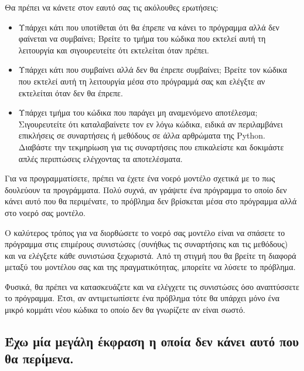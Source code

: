 \documentclass[10pt]{book}
\begin{document}
Θα πρέπει να κάνετε στον εαυτό σας τις ακόλουθες ερωτήσεις: 

\begin{itemize}

\item Υπάρχει κάτι που υποτίθεται ότι θα έπρεπε να κάνει το πρόγραμμα αλλά δεν φαίνεται να συμβαίνει;
Βρείτε το τμήμα του κώδικα που εκτελεί αυτή τη λειτουργία και σιγουρευτείτε ότι εκτελείται όταν πρέπει.

\item Υπάρχει κάτι που συμβαίνει αλλά δεν θα έπρεπε συμβαίνει;  Βρείτε τον κώδικα που εκτελεί αυτή τη
λειτουργία μέσα στο πρόγραμμά σας και ελέγξτε αν εκτελείται όταν δεν θα έπρεπε.

\item Υπάρχει τμήμα του κώδικα που παράγει μη αναμενόμενο αποτέλεσμα;  Σιγουρευτείτε ότι καταλαβαίνετε
τον εν λόγω κώδικα, ειδικά αν περιλαμβάνει επικλήσεις σε συναρτήσεις ή μεθόδους σε άλλα αρθρώματα της Python.   Διαβάστε την τεκμηρίωση για τις συναρτήσεις που επικαλείστε και δοκιμάστε απλές περιπτώσεις ελέγχοντας
τα αποτελέσματα.

\end{itemize}

Για να προγραμματίσετε, πρέπει να έχετε ένα νοερό μοντέλο σχετικά με το πως δουλεύουν τα προγράμματα.
Πολύ συχνά, αν γράψετε ένα πρόγραμμα το οποίο δεν κάνει αυτό που θα περιμένατε, το πρόβλημα δεν βρίσκεται
μέσα στο πρόγραμμα αλλά στο νοερό σας μοντέλο.

Ο καλύτερος τρόπος για να διορθώσετε το νοερό σας μοντέλο είναι να σπάσετε το πρόγραμμα στις
επιμέρους συνιστώσες (συνήθως τις συναρτήσεις και τις μεθόδους) και να ελέγξετε κάθε συνιστώσα
ξεχωριστά.  Από τη στιγμή που θα βρείτε τη διαφορά μεταξύ του μοντέλου σας και της πραγματικότητας,
μπορείτε να λύσετε το πρόβλημα.

Φυσικά, θα πρέπει να κατασκευάζετε και να ελέγχετε τις συνιστώσες όσο αναπτύσσετε το πρόγραμμα.
Έτσι, αν αντιμετωπίσετε ένα πρόβλημα τότε θα υπάρχει μόνο ένα μικρό κομμάτι νέου κώδικα το οποίο
δεν θα γνωρίζετε αν είναι σωστό.



\subsection{Έχω μία μεγάλη έκφραση η οποία δεν κάνει αυτό που θα περίμενα.}
\end{document}
